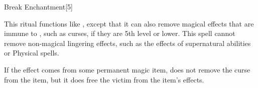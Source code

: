 \begin{spellsection}{Break Enchantment}[5]
    \begin{spellheader}
    \end{spellheader}
    \begin{spellcontent}
        \begin{spelltargetinginfo}
        \end{spelltargetinginfo}
        \begin{spelleffects}
            \spelleffect This ritual functions like , except that it can also remove magical effects that are immune to , such as curses, if they are 5th level or lower.
            This spell cannot remove non-magical lingering effects, such as the effects of supernatural abilities or Physical spells.
            \par If the effect comes from some permanent magic item,  does not remove the curse from the item, but it does free the victim from the item's effects.  %
        \end{spelleffects}
    \end{spellcontent}
    \begin{spellfooter}
    \end{spellfooter}
    \begin{spellaugments}
    \end{spellaugments}
\end{spellsection}

